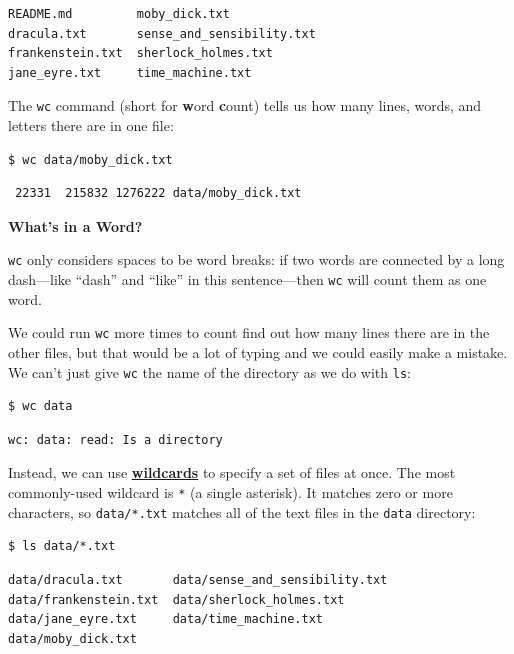 \documentclass[
]{krantz}
\renewenvironment{quote}{\begin{VF}}{\end{VF}}
\newcommand{\gref}[2]{\hyperlink{#2}{\textbf{#1}}}
\begin{document}
\begin{verbatim}
README.md         moby_dick.txt
dracula.txt       sense_and_sensibility.txt
frankenstein.txt  sherlock_holmes.txt
jane_eyre.txt     time_machine.txt
\end{verbatim}

The \texttt{wc} command (short for \textbf{w}ord \textbf{c}ount)
tells us how many lines, words, and letters there are in one file:

\begin{verbatim}
$ wc data/moby_dick.txt
\end{verbatim}

\begin{verbatim}
 22331  215832 1276222 data/moby_dick.txt
\end{verbatim}

\begin{quote}
\textbf{What's in a Word?}

\texttt{wc} only considers spaces to be word breaks:
if two words are connected by a long dash---like ``dash'' and ``like''
in this sentence---then \texttt{wc} will count them as one word.
\end{quote}

We could run \texttt{wc} more times to count find out how many lines there are in the other files,
but that would be a lot of typing
and we could easily make a mistake.
We can't just give \texttt{wc} the name of the directory as we do with \texttt{ls}:

\begin{verbatim}
$ wc data
\end{verbatim}

\begin{verbatim}
wc: data: read: Is a directory
\end{verbatim}

Instead,
we can use \gref{wildcards}{wildcard} to specify a set of files at once.
The most commonly-used wildcard is \texttt{*} (a single asterisk).
It matches zero or more characters,
so \texttt{data/*.txt} matches all of the text files in the \texttt{data} directory:

\begin{verbatim}
$ ls data/*.txt
\end{verbatim}

\begin{verbatim}
data/dracula.txt       data/sense_and_sensibility.txt
data/frankenstein.txt  data/sherlock_holmes.txt
data/jane_eyre.txt     data/time_machine.txt
data/moby_dick.txt
\end{verbatim}
\end{document}
